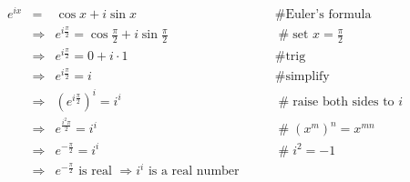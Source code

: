 \documentclass[11pt, oneside]{article}   	%
\begin{document}
    
\begin{equation*}
\begin{array}{lllll}
e^{ix}
&=& \cos x + i \sin x                                                                                     &\qquad  \mathrel{\#} \text{Euler's formula}           \\ 
&\Rightarrow& e^{i \frac{\pi}{2}}  = \cos \frac{\pi}{2} + i \sin \frac{\pi}{2}        &\qquad  \mathrel{\#} \text{set $x = \frac{\pi}{2}$}  \\
&\Rightarrow& e^{i \frac{\pi}{2}}  = 0 +  i \cdot 1                                           &\qquad  \mathrel{\#} \text{trig}                               \\
&\Rightarrow& e^{i \frac{\pi}{2}}  =  i                                                             &\qquad  \mathrel{\#} \text{simplify}                               \\
&\Rightarrow& (e^{i \frac{\pi}{2}})^i =  i^i                                                       &\qquad  \mathrel{\#} \text{raise both sides to $i$}  \\
&\Rightarrow& e^{\frac{i^2 \pi}{2}} =  i^i                                                        &\qquad  \mathrel{\#}   (x^m)^n = x^{mn}                     \\
&\Rightarrow& e^{- \frac {\pi}{2}} =  i^i                                                          &\qquad  \mathrel{\#} i^2 = -1                                   \\
&\Rightarrow& e^{- \frac {\pi}{2}} \text{ is real $\Rightarrow i^i$ is a real number}
                                                        
                                                        
                                                      
\end{array}
\end{equation*}
\end{document}
